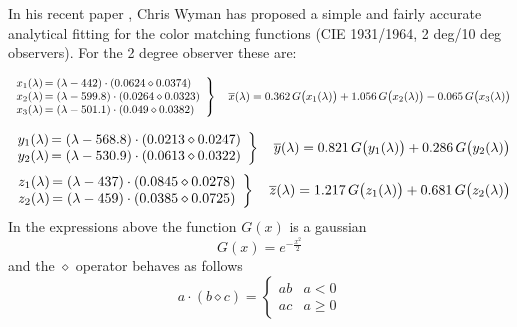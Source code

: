 In his recent paper \cite{wyman13}, Chris Wyman has proposed a simple
and fairly accurate analytical fitting for the color matching
functions (CIE 1931/1964, 2 deg/10 deg observers). For the 2 degree
observer these are:

\begin{equation}
\left.\begin{array}{r@{\,}l}
x_1(\lambda) &= (\lambda-442)   \cdot (0.0624 \diamond 0.0374) \\
x_2(\lambda) &= (\lambda-599.8) \cdot (0.0264 \diamond 0.0323) \\
x_3(\lambda) &= (\lambda-501.1) \cdot (0.049  \diamond 0.0382) \\
\end{array}\right\}\quad
\overline{x}(\lambda) =
  0.362\,G\big(x_1(\lambda)\big)
+ 1.056\,G\big(x_2(\lambda)\big)
- 0.065\,G\big(x_3(\lambda)\big)
\end{equation}

\begin{equation}
\left.\begin{array}{r@{\,}l}
y_1(\lambda) &= (\lambda-568.8) \cdot (0.0213 \diamond 0.0247) \\
y_2(\lambda) &= (\lambda-530.9) \cdot (0.0613 \diamond 0.0322) \\
\end{array}\right\}\quad
\overline{y}(\lambda) =
   0.821\,G\big(y_1(\lambda)\big)
 + 0.286 \,G\big(y_2(\lambda)\big)
\end{equation}
\begin{equation}
\left.\begin{array}{r@{\,}l}
z_1(\lambda) &= (\lambda-437) \cdot (0.0845 \diamond 0.0278) \\
z_2(\lambda) &= (\lambda-459) \cdot (0.0385 \diamond 0.0725) \\
\end{array}\right\}\quad
\overline{z}(\lambda) =
   1.217\,G\big(z_1(\lambda)\big)
 + 0.681 \,G\big(z_2(\lambda)\big)
\end{equation}
In the expressions above the function $G(x)$ is a gaussian
\begin{equation}
G(x) = e^{-\frac{x^2}{2}}
\end{equation}
and the $\diamond$ operator behaves as follows
\begin{equation}
a \cdot (b \diamond c) =
\begin{cases}
ab & a < 0 \\
ac & a \geq 0
\end{cases}
\end{equation}

